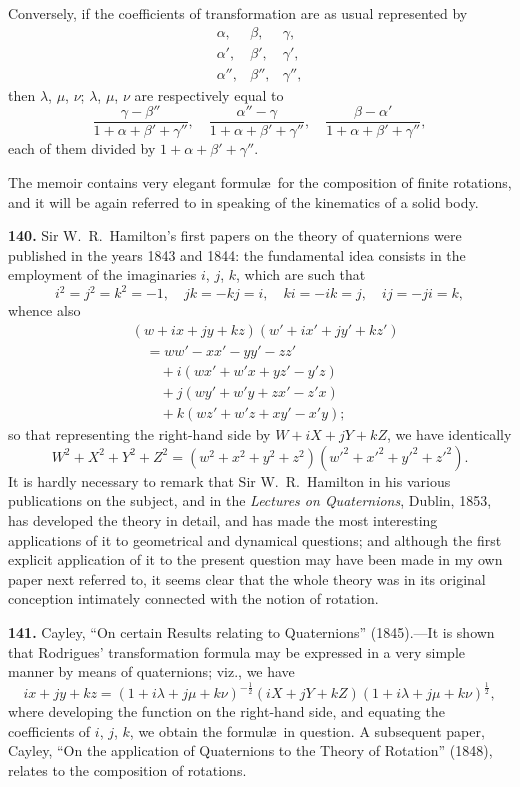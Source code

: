\documentclass[11pt,a4paper]{book}
\begin{document}
Conversely, if the coefficients of transformation are as usual represented by
\[
\begin{array}{ccc}
\alpha, & \beta, & \gamma, \\
\alpha', & \beta', & \gamma', \\
\alpha'', & \beta'', & \gamma'',
\end{array}
\]
then $\lambda$, $\mu$, $\nu$; $\lambda$, $\mu$, $\nu$ are respectively equal to
\[
\frac{\gamma - \beta''}{1 + \alpha + \beta' + \gamma''}, \quad
\frac{\alpha'' - \gamma}{1 + \alpha + \beta' + \gamma''}, \quad
\frac{\beta - \alpha'}{1 + \alpha + \beta' + \gamma''},
\]
each of them divided by $1 + \alpha + \beta' + \gamma''$.

The memoir contains very elegant formul\ae\ for the composition of finite rotations, and it will be again referred to in speaking of the kinematics of a solid body.

\textbf{140.} Sir W.~R.~Hamilton's first papers on the theory of quaternions were published in the years 1843 and 1844: the fundamental idea consists in the employment of the imaginaries $i$, $j$, $k$, which are such that
\[
i^2 = j^2 = k^2 = -1, \quad jk = -kj = i, \quad ki = -ik = j, \quad ij = -ji = k,
\]
whence also
\begin{align*}
&(w + ix + jy + kz)(w' + ix' + jy' + kz') \\
&\quad = ww' - xx' - yy' - zz' \\
&\qquad + i(wx' + w'x + yz' - y'z) \\
&\qquad + j(wy' + w'y + zx' - z'x) \\
&\qquad + k(wz' + w'z + xy' - x'y);
\end{align*}
so that representing the right-hand side by $W + iX + jY + kZ$, we have identically
\[
W^2 + X^2 + Y^2 + Z^2 = (w^2 + x^2 + y^2 + z^2)(w'^2 + x'^2 + y'^2 + z'^2).
\]
It is hardly necessary to remark that Sir W.~R.~Hamilton in his various publications on the subject, and in the \textit{Lectures on Quaternions}, Dublin, 1853, has developed the theory in detail, and has made the most interesting applications of it to geometrical and dynamical questions; and although the first explicit application of it to the present question may have been made in my own paper next referred to, it seems clear that the whole theory was in its original conception intimately connected with the notion of rotation.

\textbf{141.} Cayley, ``On certain Results relating to Quaternions'' (1845).---It is shown that Rodrigues' transformation formula may be expressed in a very simple manner by means of quaternions; viz., we have
\[
ix + jy + kz = (1 + i\lambda + j\mu + k\nu)^{-\frac{1}{2}}(iX + jY + kZ)(1 + i\lambda + j\mu + k\nu)^{\frac{1}{2}},
\]
where developing the function on the right-hand side, and equating the coefficients of $i$, $j$, $k$, we obtain the formul\ae\ in question. A subsequent paper, Cayley, ``On the application of Quaternions to the Theory of Rotation'' (1848), relates to the composition of rotations.
\end{document}
